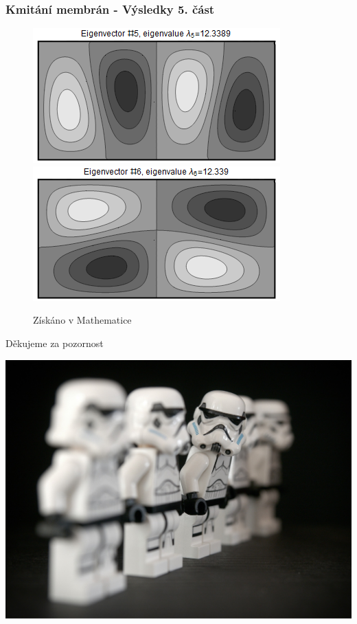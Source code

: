 \documentclass{beamer}
\begin{document}
\begin{frame}
\frametitle{Kmitání membrán - Výsledky 5. část}
\centering
\begin{figure}
\includegraphics[width=.6\linewidth]{rectangle-eigenvector-5.png}
\includegraphics[width=.6\linewidth]{rectangle-eigenvector-6.png}
\caption{Získáno v Mathematice}
\end{figure}
\end{frame}

\begin{frame}
\begin{center}
\begin{huge}
Děkujeme za pozornost
\end{huge}
  \centering
  \includegraphics[width=.8\linewidth]{stormtroop.jpg}
\end{center}

\end{frame}
\end{document}
